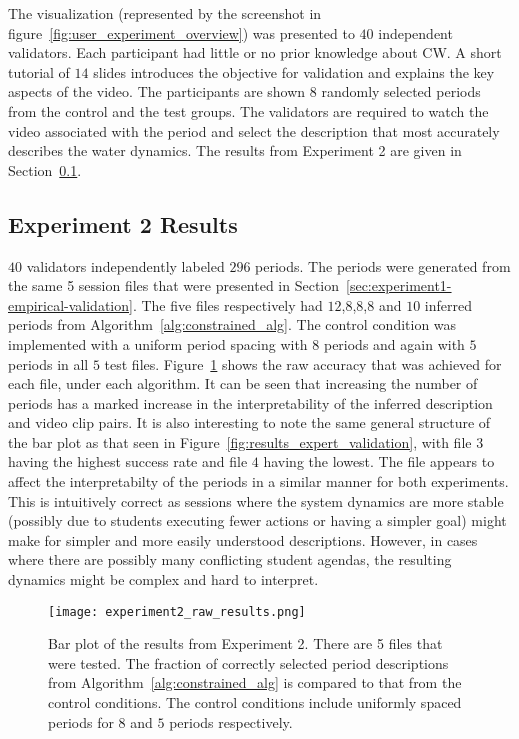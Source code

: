 The visualization (represented by the screenshot in figure~\ref{fig:user_experiment_overview}) was presented to $40$ independent validators. Each participant had little or no prior knowledge about CW. A short tutorial of $14$ slides introduces the objective for validation and explains the key aspects of the video. The participants are shown $8$ randomly selected periods from the control and the test groups. The validators are required to watch the video associated with the period and select the description that most accurately describes the water dynamics. The results from Experiment 2 are given in Section~\ref{sec:experiment2-empirical-validation-results}.

\subsection{Experiment 2 Results}\label{sec:experiment2-empirical-validation-results}

$40$ validators independently labeled $296$ periods. The periods were generated from the same 5 session files that were presented in Section~\ref{sec:experiment1-empirical-validation}. The five files respectively had $12$,$8$,$8$,$8$ and $10$ inferred periods from Algorithm~\ref{alg:constrained_alg}. The control condition was implemented with a uniform period spacing with $8$ periods and again with $5$ periods in all $5$ test files. Figure~\ref{fig:experiment2_raw_results} shows the raw accuracy that was achieved for each file, under each algorithm. It can be seen that increasing the number of periods has a marked increase in the interpretability of the inferred description and video clip pairs. It is also interesting to note the same general structure of the bar plot as that seen in Figure~\ref{fig:results_expert_validation}, with file $3$ having the highest success rate and file $4$ having the lowest. The file appears to affect the interpretabilty of the periods in a similar manner for both experiments. This is intuitively correct as sessions where the system dynamics are more stable (possibly due to students executing fewer actions or having a simpler goal) might make for simpler and more easily understood descriptions. However, in cases where there are possibly many conflicting student agendas, the resulting dynamics might be complex and hard to interpret.

\begin{figure}
\centering
\texttt{[image: experiment2\_raw\_results.png]}
\caption{Bar plot of the results from Experiment 2. There are 5 files that were tested. The fraction of correctly selected period descriptions from Algorithm~\ref{alg:constrained_alg} is compared to that from the control conditions. The control conditions include uniformly spaced periods for $8$ and $5$ periods respectively.}
\label{fig:experiment2_raw_results}
\end{figure}


